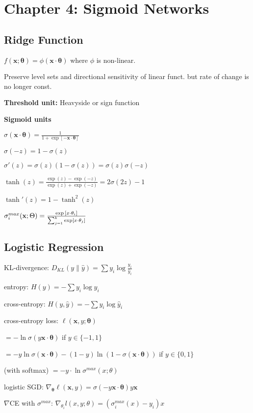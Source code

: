 \section*{Chapter 4: Sigmoid Networks}

\subsection*{Ridge Function}

$f(\mathbf x;\bm{\theta})=\phi(\mathbf x \cdot\bm \theta)$ where $\phi$ is non-linear.

Preserve level sets and directional sensitivity of linear funct. but rate of change is no longer const.

\textbf{Threshold unit:} Heavyside or sign function

\textbf{Sigmoid units}

$\sigma(\mathbf x\cdot\bm\theta)=\frac{1}{1+\exp[-\mathbf x \cdot\bm\theta]}$

$\sigma(-z) = 1-\sigma(z)$

$\sigma'(z)=\sigma(z)(1-\sigma(z))=\sigma(z)\sigma(-z)$

$\tanh(z)=\frac{\exp(z)-\exp(-z)}{\exp(z)+\exp(-z)} = 2\sigma(2z) - 1$

$\tanh'(z)=1-\tanh^2(z)$

$\sigma_i^{max}(\mathbf{x}; \Theta) = \frac{\exp{[x\cdot\theta_i]}}{\sum_{j=1}^k\exp[x\cdot\theta_j]}$
\subsection*{Logistic Regression}

KL-divergence: $D_{KL}(y\|\hat y) = \sum y_i\log\frac {y_i} {\hat y_i}$

entropy: $H(y) = -\sum y_i\log y_i$

cross-entropy: $H(y, \hat y) = -\sum y_i\log\hat y_i$

cross-entropy loss: $\ell(\mathbf x, y;\bm \theta)$

$=-\ln\sigma(y\mathbf x\cdot\bm\theta)$ if $y \in\{-1, 1\}$

$=-y\ln\sigma(\mathbf x\cdot\bm\theta) - (1-y)\ln(1-\sigma(\mathbf x \cdot \bm \theta))$ if $y \in\{0, 1\}$

(with softmax) $=-y\cdot \ln\sigma^{max}(x;\theta)$

logistic SGD: $\nabla_{\bm\theta}\ell(\mathbf x, y) = \sigma(-y\mathbf x\cdot\bm\theta)y\mathbf x$

$\nabla$CE with $\sigma^{max}$: $\nabla_{\theta_i}l(x,y;\theta) = (\sigma_i^{max}(x)-y_i)x$ 


